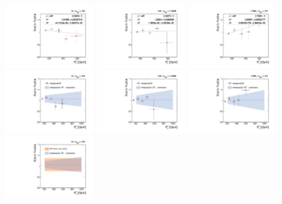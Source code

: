 \begin{figure}[!htbp]
  \centering
  \includegraphics[width=0.3\textwidth]{fig/Extrapolate_2017_0_Fit.pdf}
  \includegraphics[width=0.3\textwidth]{fig/Extrapolate_2017_1_Fit.pdf}
  \includegraphics[width=0.3\textwidth]{fig/Extrapolate_2017_2_Fit.pdf}\\
  \includegraphics[width=0.3\textwidth]{fig/Extrapolate_2017_0_Check.pdf}
  \includegraphics[width=0.3\textwidth]{fig/Extrapolate_2017_1_Check.pdf}
  \includegraphics[width=0.3\textwidth]{fig/Extrapolate_2017_2_Check.pdf}\\
  \includegraphics[width=0.3\textwidth]{fig/Extrapolate_2017_0_Compare.pdf}

\end{figure}

